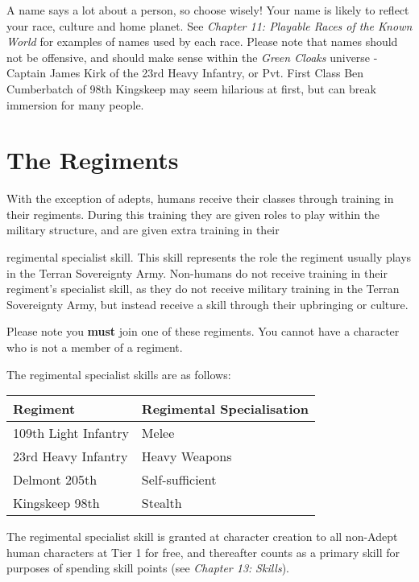 A name says a lot about a person, so choose wisely! Your name is likely to reflect your race, culture and home planet. See \textit{Chapter 11: Playable Races of the Known World} for examples of names used by each race. Please note that names should not be offensive, and should make sense within the \textit{Green Cloaks} universe - Captain James Kirk of the 23rd Heavy Infantry, or Pvt. First Class Ben Cumberbatch of 98th Kingskeep may seem hilarious at first, but can break immersion for many people.

\chapter{The Regiments}

With the exception of adepts, humans receive their classes through training in their regiments. During this training they are given roles to play within the military structure, and are given extra training in their

regimental specialist skill. This skill represents the role the regiment usually plays in the Terran Sovereignty Army. Non-humans do not receive training in their regiment's specialist skill, as they do not receive military training in the Terran Sovereignty Army, but instead receive a skill through their upbringing or culture.

Please note you \textbf{must} join one of these regiments. You cannot have a character who is not a member of a regiment.

The regimental specialist skills are as follows:

\begin{table}[H]
\begin{tabular}{|l|l|} \hline 
Regiment & Regimental Specialisation \\
 \hline 109th Light Infantry & Melee \\
 \hline 23rd Heavy Infantry & Heavy Weapons \\
 \hline Delmont 205th & Self-sufficient \\
 \hline Kingskeep 98th & Stealth \\
 \hline \end{tabular}

\end{table}

The regimental specialist skill is granted at character creation to all non-Adept human characters at Tier 1 for free, and thereafter counts as a primary skill for purposes of spending skill points (see \textit{Chapter 13:} \textit{Skills}).


